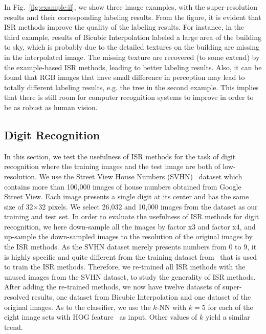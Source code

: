 In Fig.~\ref{fig:example:il}, we show three image examples, with the
super-resolution results and their corresponding labeling
results. From the figure, it is evident that ISR methods improve the
quality of the labeling results. For instance, in the third example,
results of Bicubic Interpolation labeled a large area of the building
to sky, which is probably due to the detailed textures on the building
are missing in the interpolated image. The missing texture  are recovered (to some
extend) by the example-based ISR methods, leading to better labeling
results. Also, it can be found that RGB images that have small
difference in perception may lead to totally different labeling
results, e.g. the tree in the second example. This implies that there
is still room for computer recognition systems to improve
in order to be as robust as human vision.  





\subsection{Digit Recognition}
\label{sec:dr}


In this section, we test the usefulness of ISR methods for the task of
digit recognition where the training images and the test image are
both of low-resolution.  We use the Street View House Numbers
(SVHN)~\cite{37648} dataset which contains more than 100,000 images of
house numbers obtained from Google Street View. Each image presents a
single digit at its center and has the same size of 32$\times$32
pixels.  We select 26,032 and 10,000 images from the dataset as our
training and test set.  In order to evaluate the usefulness of ISR
methods for digit recognition, we here down-sample all the images by
factor x3 and factor x4, and up-sample the down-sampled images to the
resolution of the original images by the ISR methods.  As the SVHN
dataset merely presents numbers from 0 to 9, it is highly specific and
quite different from the training dataset from~\cite{Yang-TIP-2010}
that is used to train the ISR methods. Therefore, we re-trained all ISR methods
with the unused images from the SVHN dataset, to study the generality of ISR methods. After adding the
re-trained methods, we now have twelve datasets of super-resolved
results, one dataset from Bicubic Interpolation and one dataset of
the original images. As to the classifier, we use the $k$-NN with $k=5$ for each of the eight
image sets with HOG feature~\cite{Dalal_HoG} as input. Other values of $k$ yield a similar trend.


